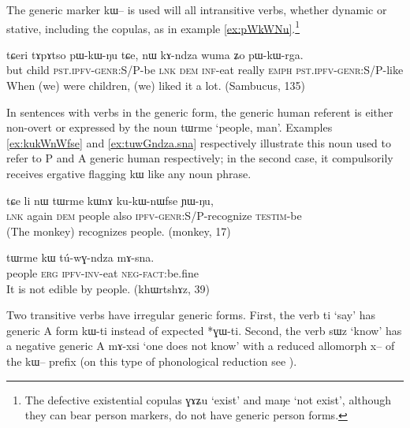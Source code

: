 \documentclass[oldfontcommands,oneside,a4paper,11pt]{article}
\newcommand{\ipa}[1]{{\phon \mbox{#1}}} %
\begin{document}
The generic marker \ipa{kɯ--} is used will all intransitive verbs, whether dynamic or stative, including the copulas, as in example \ref{ex:pWkWNu}.\footnote{The defective existential copulas \ipa{ɣɤʑu} `exist' and \ipa{maŋe} `not exist', although they can bear person markers, do not have generic person forms. }

\begin{exe}
\ex \label{ex:pWkWNu}
\gll
\ipa{tɕeri} 	\ipa{tɤpɤtso} 	\ipa{pɯ-kɯ-ŋu} 	\ipa{tɕe,} 	\ipa{nɯ} 	\ipa{kɤ-ndza} 	\ipa{wuma} 	\ipa{ʑo} 	\ipa{pɯ-kɯ-rga.} \\
but child \textsc{pst.ipfv-genr}:S/P-be \textsc{lnk} \textsc{dem} \textsc{inf}-eat really \textsc{emph} \textsc{pst.ipfv-genr}:S/P-like \\
\glt When (we) were children, (we) liked it a lot. (Sambucus, 135)
\end{exe}

In sentences with verbs in the generic form, the generic  human referent is either non-overt or expressed by the noun \ipa{tɯrme} `people, man'. Examples \ref{ex:kukWnWfse} and \ref{ex:tuwGndza.sna} respectively illustrate this noun used to  refer to P and A generic human respectively; in the second case, it   compulsorily receives  ergative flagging \ipa{kɯ} like any   noun phrase.

\begin{exe}
\ex \label{ex:kukWnWfse}
\gll
\ipa{tɕe}  	\ipa{li}  	\ipa{nɯ}  	\ipa{tɯrme}  	\ipa{kɯnɤ}  	\ipa{ku-kɯ-nɯfse}  	\ipa{ɲɯ-ŋu,}\\
\textsc{lnk} again \textsc{dem} people also \textsc{ipfv-genr:S/P}-recognize \textsc{testim}-be\\
\glt  (The monkey) recognizes people. (monkey, 17)
\end{exe}

\begin{exe}
\ex \label{ex:tuwGndza.sna}
\gll
\ipa{tɯrme}  	\ipa{kɯ}  	\ipa{tú-wɣ-ndza}  	\ipa{mɤ-sna.}   \\
people \textsc{erg} \textsc{ipfv-inv}-eat \textsc{neg-fact}:be.fine \\
\glt It is not edible by people. (khɯrtshɤz, 39)
\end{exe}


Two transitive verbs have irregular generic forms. First, the verb \ipa{ti} `say' has generic A form \ipa{kɯ-ti} instead of expected *\ipa{ɣɯ-ti}. Second, the verb \ipa{sɯz} `know' has a negative generic A \ipa{mɤ-xsi} `one does not know' with a reduced allomorph \ipa{x--} of the \ipa{kɯ--} prefix (on this type of phonological reduction see \citealt{jacques14antipassive}).
\end{document}
